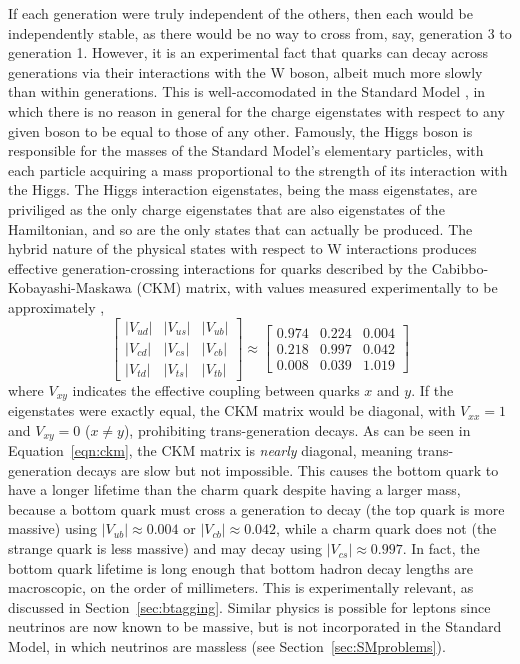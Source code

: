   If each generation were truly independent of the others, then each would be independently stable, as there would be no way to cross from, say, generation 3 to generation 1.
  However, it is an experimental fact that quarks can decay across generations via their interactions with the W boson, albeit much more slowly than within generations.
  This is well-accomodated in the Standard Model \cite{cabibbo,ckm}, in which there is no reason in general for the charge eigenstates with respect to any given boson to be equal to those of any other.
  Famously, the Higgs boson is responsible for the masses of the Standard Model's elementary particles, with each particle acquiring a mass proportional to the strength of its interaction with the Higgs.
  The Higgs interaction eigenstates, being the mass eigenstates, are priviliged as the only charge eigenstates that are also eigenstates of the Hamiltonian, and so are the only states that can actually be produced.
  The hybrid nature of the physical states with respect to W interactions produces effective generation-crossing interactions for quarks described by the Cabibbo-Kobayashi-Maskawa (CKM) matrix, with values measured experimentally to be approximately \cite{pdg},
  \begin{equation} \label{eqn:ckm}
    \begin{bmatrix} 
      |V_{ud}| & |V_{us}| & |V_{ub}| \\
      |V_{cd}| & |V_{cs}| & |V_{cb}| \\
      |V_{td}| & |V_{ts}| & |V_{tb}| 
    \end{bmatrix}
\approx
    \begin{bmatrix} 
      0.974 & 0.224 & 0.004 \\
      0.218 & 0.997 & 0.042 \\
      0.008 & 0.039 & 1.019
    \end{bmatrix}
  \end{equation}
  where $V_{xy}$ indicates the effective coupling between quarks $x$ and $y$.
  If the eigenstates were exactly equal, the CKM matrix would be diagonal, with $V_{xx} = 1$ and $V_{xy} = 0$ ($x \neq y$), prohibiting trans-generation decays.
  As can be seen in Equation~\ref{eqn:ckm}, the CKM matrix is {\it nearly} diagonal, meaning trans-generation decays are slow but not impossible.
  This causes the bottom quark to have a longer lifetime than the charm quark despite having a larger mass, because a bottom quark must cross a generation to decay  (the top quark is more massive) using $|V_{ub}| \approx 0.004$ or $|V_{cb}| \approx 0.042$, while a charm quark does not (the strange quark is less massive) and may decay using $|V_{cs}| \approx 0.997$.
  In fact, the bottom quark lifetime is long enough that bottom hadron decay lengths are macroscopic, on the order of millimeters.
  This is experimentally relevant, as discussed in Section~\ref{sec:btagging}.
  Similar physics is possible for leptons since neutrinos are now known to be massive, but is not incorporated in the Standard Model, in which neutrinos are massless (see Section~\ref{sec:SMproblems}).

